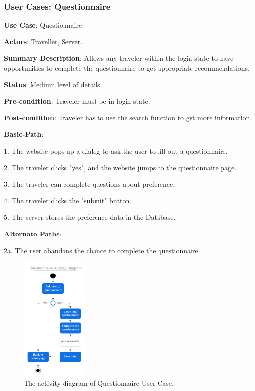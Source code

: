 \documentclass[conference]{IEEEtran}
\begin{document}
\subsubsection{User Cases: Questionnaire}

\textbf{ }

\textbf{Use Case}: Questionnaire

\textbf{Actors}: Traveller, Server.

\textbf{Summary Description}: Allows any traveler within the login state to have opportunities to complete the questionnaire to get appropriate recommendations.
 
\textbf{Status}: Medium level of details.

\textbf{Pre-condition}: Traveler must be in login state.

\textbf{Post-condition}: Traveler has to use the search function to get more information.

\textbf{Basic-Path}:

1. The website pops up a dialog to ask the user to fill out a questionnaire.

2. The traveler clicks "yes", and the website jumps to the questionnaire page.

3. The traveler can complete questions about preference.

4. The traveler clicks the "submit" button.

5. The server stores the preference data in the Database.

\textbf{Alternate Paths}:

2a. The user abandons the chance to complete the questionnaire.


\begin{figure}[htbp]
\centerline{\includegraphics[width=0.3\textwidth]{activity_diagram_question.pdf}}
\caption{The activity diagram of Questionnaire User Case.}
\label{fig4}
\end{figure}
\end{document}

